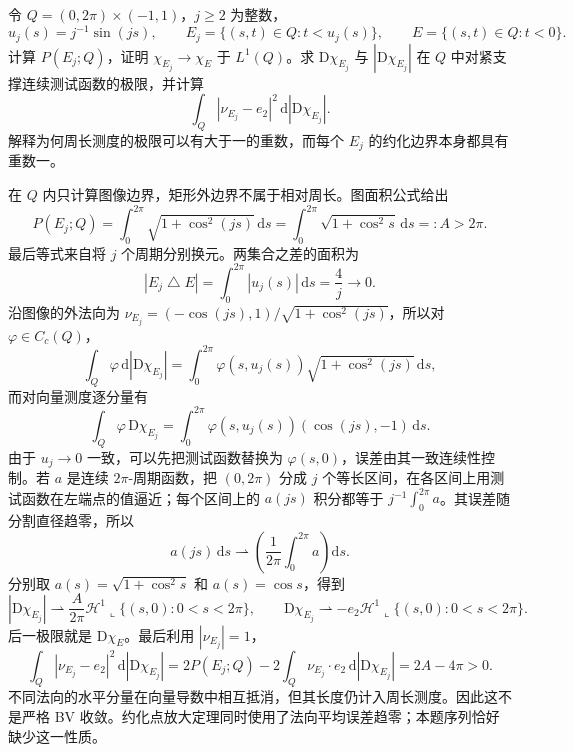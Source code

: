 \begin{exercise}\label{g3:ex:oscillating-perimeter-multiplicity}
	令 \(Q=(0,2\pi)\times(-1,1)\)，\(j\ge2\) 为整数，
	\[
		u_j(s)=j^{-1}\sin(js),\qquad
		E_j=\{(s,t)\in Q:t<u_j(s)\},\qquad
		E=\{(s,t)\in Q:t<0\}.
	\]
	计算 \(P(E_j;Q)\)，证明 \(\chi_{E_j}\to\chi_E\) 于 \(L^1(Q)\)。求 \(\mathrm D\chi_{E_j}\) 与 \(|\mathrm D\chi_{E_j}|\) 在 \(Q\) 中对紧支撑连续测试函数的极限，并计算
	\[
		\int_Q|\nu_{E_j}-e_2|^2\,\mathrm d|\mathrm D\chi_{E_j}|.
	\]
	解释为何周长测度的极限可以有大于一的重数，而每个 \(E_j\) 的约化边界本身都具有重数一。
\end{exercise}
\begin{solution}
	在 \(Q\) 内只计算图像边界，矩形外边界不属于相对周长。图面积公式给出
	\[
		P(E_j;Q)=\int_0^{2\pi}\sqrt{1+\cos^2(js)}\,\mathrm ds
		=\int_0^{2\pi}\sqrt{1+\cos^2 s}\,\mathrm ds=:A>2\pi.
	\]
	最后等式来自将 \(j\) 个周期分别换元。两集合之差的面积为
	\[
		|E_j\mathbin{\triangle}E|
		=\int_0^{2\pi}|u_j(s)|\,\mathrm ds
		=\frac4j\longrightarrow0.
	\]
	沿图像的外法向为
	\(\nu_{E_j}=(-\cos(js),1)/\sqrt{1+\cos^2(js)}\)，所以对 \(\varphi\in C_c(Q)\)，
	\[
		\int_Q\varphi\,\mathrm d|\mathrm D\chi_{E_j}|
		=\int_0^{2\pi}\varphi(s,u_j(s))\sqrt{1+\cos^2(js)}\,\mathrm ds,
	\]
	而对向量测度逐分量有
	\[
		\int_Q\varphi\,\mathrm D\chi_{E_j}
		=\int_0^{2\pi}\varphi(s,u_j(s))(\cos(js),-1)\,\mathrm ds.
	\]
	由于 \(u_j\to0\) 一致，可以先把测试函数替换为 \(\varphi(s,0)\)，误差由其一致连续性控制。若 \(a\) 是连续 \(2\pi\)-周期函数，把 \((0,2\pi)\) 分成 \(j\) 个等长区间，在各区间上用测试函数在左端点的值逼近；每个区间上的 \(a(js)\) 积分都等于 \(j^{-1}\int_0^{2\pi}a\)。其误差随分割直径趋零，所以
	\[
		a(js)\,\mathrm ds\rightharpoonup
		\left(\frac1{2\pi}\int_0^{2\pi}a\right)\mathrm ds.
	\]
	分别取 \(a(s)=\sqrt{1+\cos^2s}\) 和 \(a(s)=\cos s\)，得到
	\[
		|\mathrm D\chi_{E_j}|\rightharpoonup
		\frac A{2\pi}\mathcal H^1\llcorner\{(s,0):0<s<2\pi\},
		\qquad
		\mathrm D\chi_{E_j}\rightharpoonup
		-e_2\mathcal H^1\llcorner\{(s,0):0<s<2\pi\}.
	\]
	后一极限就是 \(\mathrm D\chi_E\)。最后利用 \(|\nu_{E_j}|=1\)，
	\[
		\int_Q|\nu_{E_j}-e_2|^2\,\mathrm d|\mathrm D\chi_{E_j}|
		=2P(E_j;Q)-2\int_Q\nu_{E_j}\cdot e_2\,\mathrm d|\mathrm D\chi_{E_j}|
		=2A-4\pi>0.
	\]
	不同法向的水平分量在向量导数中相互抵消，但其长度仍计入周长测度。因此这不是严格 BV 收敛。约化点放大定理同时使用了法向平均误差趋零；本题序列恰好缺少这一性质。
\end{solution}


